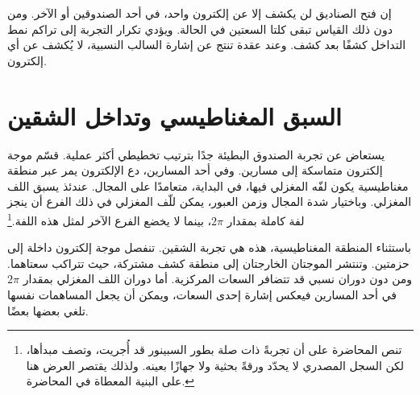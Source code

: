 \begin{classroomqa}
\end{classroomqa}

إن فتح الصناديق لن يكشف إلا عن إلكترون واحد، في أحد الصندوقين أو الآخر. ومن دون ذلك القياس تبقى كلتا السعتين في الحالة. ويؤدي تكرار التجربة إلى تراكم نمط التداخل كشفًا بعد كشف. وعند عقدة تنتج عن إشارة السالب النسبية، لا يُكشف عن أي إلكترون.

\section{السبق المغناطيسي وتداخل الشقين}

يستعاض عن تجربة الصندوق البطيئة جدًا بترتيب تخطيطي أكثر عملية. قسّم موجة إلكترون متماسكة إلى مسارين. وفي أحد المسارين، دع الإلكترون يمر عبر منطقة مغناطيسية يكون لفّه المغزلي فيها، في البداية، متعامدًا على المجال. عندئذ يسبق اللف المغزلي. وباختيار شدة المجال وزمن العبور، يمكن للّف المغزلي في ذلك الفرع أن ينجز لفة كاملة بمقدار \(2\pi\)، بينما لا يخضع الفرع الآخر لمثل هذه اللفة.\footnote{تنص المحاضرة على أن تجربةً ذات صلة بطور السبينور قد أُجريت، وتصف مبدأها، لكن السجل المصدري لا يحدّد ورقةً بحثية ولا جهازًا بعينه. ولذلك يقتصر العرض هنا على البنية المعطاة في المحاضرة.}

\begin{classroomqa}
\end{classroomqa}

\begin{classroomqa}
\end{classroomqa}

باستثناء المنطقة المغناطيسية، هذه هي تجربة الشقين. تنفصل موجة إلكترون داخلة إلى حزمتين. وتنتشر الموجتان الخارجتان إلى منطقة كشف مشتركة، حيث تتراكب سعتاهما. ومن دون دوران نسبي قد تتضافر السعات المركزية. أما دوران اللف المغزلي بمقدار \(2\pi\) في أحد المسارين فيعكس إشارة إحدى السعات، ويمكن أن يجعل المساهمات نفسها تلغي بعضها بعضًا.


